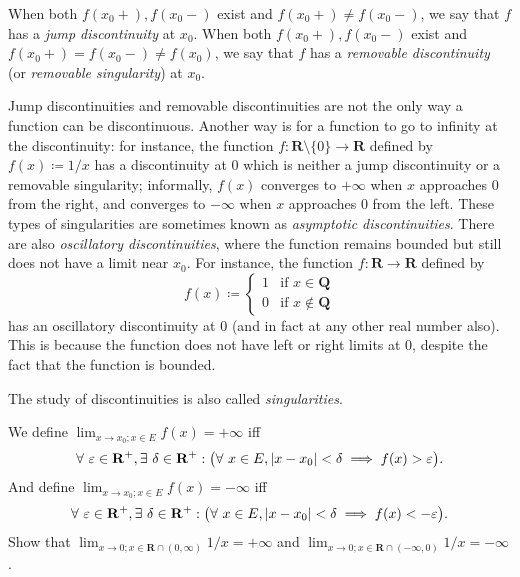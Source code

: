 \begin{note}
    When both \(f(x_0+), f(x_0-)\) exist and \(f(x_0+) \neq f(x_0-)\), we say that \(f\) has a \emph{jump discontinuity} at \(x_0\).
    When both \(f(x_0+), f(x_0-)\) exist and \(f(x_0+) = f(x_0-) \neq f(x_0)\), we say that \(f\) has a \emph{removable discontinuity} (or \emph{removable singularity}) at \(x_0\).
\end{note}

\begin{remark}\label{9.5.4}
    Jump discontinuities and removable discontinuities are not the only way a function can be discontinuous.
    Another way is for a function to go to infinity at the discontinuity:
    for instance, the function \(f : \mathbf{R} \setminus \{0\} \to \mathbf{R}\) defined by \(f(x) \coloneqq 1 / x\) has a discontinuity at \(0\) which is neither a jump discontinuity or a removable singularity;
    informally, \(f(x)\) converges to \(+\infty\) when \(x\) approaches \(0\) from the right, and converges to \(-\infty\) when \(x\) approaches \(0\) from the left.
    These types of singularities are sometimes known as \emph{asymptotic discontinuities}.
    There are also \emph{oscillatory discontinuities}, where the function remains bounded but still does not have a limit near \(x_0\).
    For instance, the function \(f : \mathbf{R} \to \mathbf{R}\) defined by
    \[
        f(x) \coloneqq \begin{cases}
            1 & \text{if } x \in \mathbf{Q}    \\
            0 & \text{if } x \notin \mathbf{Q}
        \end{cases}
    \]
    has an oscillatory discontinuity at \(0\) (and in fact at any other real number also).
    This is because the function does not have left or right limits at \(0\), despite the fact that the function is bounded.
\end{remark}

\begin{note}
    The study of discontinuities is also called \emph{singularities}.
\end{note}

\begin{additional corollary}\label{ac 9.5.2}
We define \(\lim_{x \to x_0 ; x \in E} f(x) = +\infty\) iff
\[
    \forall\ \varepsilon \in \mathbf{R}^+, \exists\ \delta \in \mathbf{R}^+ : \big(\forall\ x \in E, \abs*{x - x_0} < \delta \implies f(x) > \varepsilon\big).
\]
And define \(\lim_{x \to x_0 ; x \in E} f(x) = -\infty\) iff
\[
    \forall\ \varepsilon \in \mathbf{R}^+, \exists\ \delta \in \mathbf{R}^+ : \big(\forall\ x \in E, \abs*{x - x_0} < \delta \implies f(x) < -\varepsilon\big).
\]
Show that \(\lim_{x \to 0 ; x \in \mathbf{R} \cap (0, \infty)} 1 / x = +\infty\) and \(\lim_{x \to 0 ; x \in \mathbf{R} \cap (-\infty, 0)} 1 / x = -\infty\).
\end{additional corollary}

